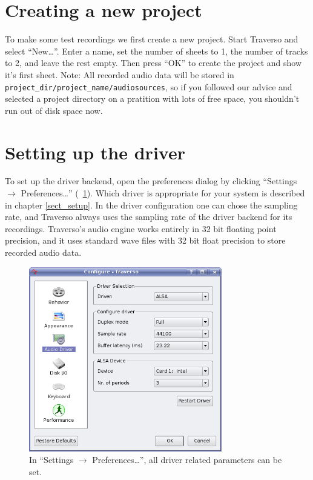 \section{Creating a new project}
To make some test recordings we first create a new project. Start Traverso and select ``New\dots''. Enter a name, set the number of sheets to 1, the number of tracks to 2, and leave the rest empty. Then press ``OK'' to create the project and show it's first sheet. Note: All recorded audio data will be stored in \texttt{project\_dir/project\_name/audiosources}, so if you followed our advice and selected a project directory on a pratition with lots of free space, you shouldn't run out of disk space now.

\section{Setting up the driver}
To set up the driver backend, open the preferences dialog by clicking ``Settings $\rightarrow$ Preferences\dots'' (\FigB\ \ref{fig_driversettings}). Which driver is appropriate for your system is described in chapter \ref{sect_setup}. In the driver configuration one can chose the sampling rate, and Traverso always uses the sampling rate of the driver backend for its recordings. Traverso's audio engine works entirely in 32 bit floating point precision, and it uses standard wave files with 32 bit float precision to store recorded audio data.

\begin{figure}
 \centering\includegraphics[width=0.75\textwidth]{images/driversettings.png}
 \caption{In ``Settings $\rightarrow$ Preferences\dots'', all driver related parameters can be set.}
 \label{fig_driversettings}
\end{figure}

